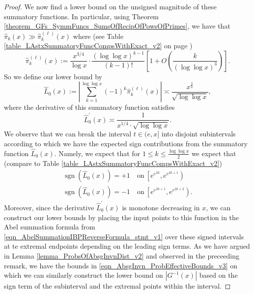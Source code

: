 \documentclass[11pt,reqno,a4letter]{article}
\numberwithin{figure}{section}
\numberwithin{table}{section}
\theoremstyle{plain}
\numberwithin{theorem}{section}
\theoremstyle{definition}
\begin{document}
\begin{proof}
We now find a lower bound on the unsigned magnitude of these summatory functions. 
In particular, using Theorem \ref{theorem_GFs_SymmFuncs_SumsOfRecipOfPowsOfPrimes}, 
we have that $\widehat{\pi}_k(x) \gg \widehat{\pi}_k^{(\ell)}(x)$ where 
(see Table \ref{table_LAstxSummatoryFuncCompsWithExact_v2} on page 
\pageref{table_LAstxSummatoryFuncCompsWithExact_v2}) 
\[
\widehat{\pi}_k^{(\ell)}(x) := \frac{x^{3/4}}{\log x} \cdot 
     \frac{(\log\log x)^{k-1}}{(k-1)!} \left[1 + 
     O\left(\frac{k}{(\log\log x)^3}\right)\right].
\]
So we define our lower bound by 
\[
\widehat{L}_0(x) := \left\lvert \sum_{k=1}^{\log\log x} (-1)^{k} \widehat{\pi}_k^{(\ell)}(x) \right\rvert 
     \asymp \frac{x^{\frac{3}{4}}}{\sqrt{\log\log x}}, 
\]
where the derivative of this summatory function satisfies 
\[
\widehat{L}_0^{\prime}(x) \asymp \frac{1}{x^{1/4} \cdot \sqrt{\log\log x}}. 
\]
We observe that we can break the interval $t \in (e, x]$ into disjoint subintervals 
according to which we have the expected sign contributions from the 
summatory function $\widehat{L}_0(x)$. Namely, we expect that 
for $1 \leq k \leq \frac{\log\log x}{2}$ we expect that 
(compare to Table \ref{table_LAstxSummatoryFuncCompsWithExact_v2}) 
\begin{align*} 
\operatorname{sgn}\left(\widehat{L}_0(x)\right) = +1 & \mathrm{\ on\ } 
     \left[e^{e^{2k}}, e^{e^{2k+1}}\right) \\ 
\operatorname{sgn}\left(\widehat{L}_0(x)\right) = -1 & \mathrm{\ on\ } 
     \left[e^{e^{2k+1}}, e^{e^{2k+2}}\right). 
\end{align*} 
Moreover, since the derivative $\widehat{L}_0^{\prime}(x)$ is monotone decreasing in $x$, 
we can construct our lower bounds by placing the input points to this function 
in the Abel summation formula from 
\eqref{eqn_AbelSummationIBPReverseFormula_stmt_v1} 
over these signed intervals at te extremal endpoints depending on the leading sign terms. 
As we have argued in Lemma \ref{lemma_ProbsOfAbsgInvnDist_v2} and 
observed in the preceeding remark, we have the bounds in 
\eqref{eqn_AbsgInvn_ProbEffectiveBounds_v3} on which 
we can similarly construct the lower bound on $|G^{-1}(x)|$ based on the 
sign term of the subinterval and the extremal points within the interval. 


\end{proof}
\end{document}
